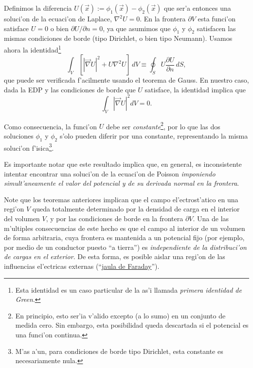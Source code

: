 Definimos la diferencia $U(\vec{x}):=\phi_1(\vec{x})-\phi_2(\vec{x})$ que ser'a entonces una soluci'on de la ecuaci'on de Laplace, $\nabla^2U=0$. En la frontera $\partial V$ esta funci'on satisface $U=0$ o bien ${\partial U}/{\partial n}=0$, ya que asumimos que $\phi_1$ y $\phi_2$ satisfacen las mismas condiciones de borde (tipo Dirichlet, o bien tipo Neumann). Usamos ahora la identidad\footnote{Esta identidad es un caso particular de la as'i llamada \textit{primera identidad de Green}.}
\begin{equation}
 \int_V\left[\left|\vec\nabla U\right|^2+U\nabla^2U\right]  \,dV
 \equiv\oint_SU\frac{\partial U}{\partial n}\,dS,
 \end{equation}
que puede ser verificada f'acilmente usando el teorema de Gauss. En nuestro caso, dada la EDP y las condiciones de borde que $U$ satisface, la identidad implica que
\begin{equation}
 \int_V\left|\vec\nabla U\right|^2dV=0.
\end{equation}

Como consecuencia, la funci'on $U$ debe ser \textit{constante}\footnote{En principio, esto ser'ia v'alido excepto (a lo sumo) en un conjunto de medida cero. Sin embargo, esta posibilidad queda descartada si el potencial es una funci'on continua.}, por lo que las dos soluciones $\phi_1$ y $\phi_2$ s'olo pueden diferir por una constante, representando la misma soluci'on f'isica\footnote{M'as a'un, para condiciones de borde tipo Dirichlet, esta constante es necesariamente nula.}.

Es importante notar que este resultado implica que, en general, es inconsistente intentar encontrar una soluci'on de la ecuaci'on de Poisson \textit{imponiendo simult'aneamente el valor del potencial y de su derivada normal en la frontera}.

Note que los teoremas anteriores implican que el campo el'ectrost'atico en una regi'on $V$ queda totalmente determinado por la densidad de carga en el interior del volumen $V$, y por las condiciones de borde en la frontera $\partial V$. Una de las m'ultiples consecuencias de este hecho es que el campo al interior de un volumen de forma arbitraria, cuya frontera es mantenida a un potencial fijo (por ejemplo, por medio de un conductor puesto ``a tierra'') es \textit{independiente de la distribuci'on de cargas en el exterior}. De esta forma, es posible aislar una regi'on de las influencias el'ectricas externas (``\href{https://es.wikipedia.org/wiki/Jaula_de_Faraday}{jaula de Faraday}'').


